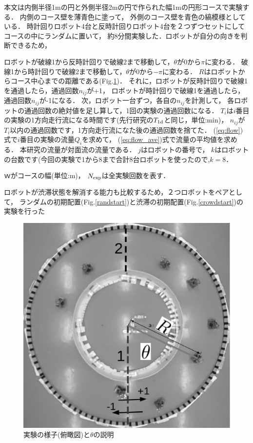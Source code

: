 本文は内側半径1mの円と外側半径2mの円で作られた幅1mの円形コースで実験する．
内側のコース壁を薄青色に塗って，
外側のコース壁を青色の縞模様としている．
時計回りロボット4台と反時計回りロボット4台を２つずつセットにしてコースの中にランダムに置いて，
約8分間実験した．ロボットが自分の向きを判断できるため，


ロボットが破線1から反時計回りで破線2まで移動して，$\theta$が0から$\pi$に変わる．
破線1から時計回りで破線2まで移動して，$\theta$が0から$-\pi$に変わる．
$R$はロボットからコース中心までの距離である(Fig.\ref{courseshitar})．
それに，ロボットが反時計回りで破線1を通過したら，通過回数$n_{ij}$が+1，
ロボットが時計回りで破線1を通過したら，通過回数$n_{ij}$が-1になる．
次，ロボット一台ずつ，各自の$n_{ij}$を計測して，
各ロボットの通過回数の絶対値を足し算して，1回の実験の通過回数になる．
$T_i$は$i$番目の実験の1方向走行流になる時間です(先行研究\cite{li}の$T_{\rm 1d}$と同じ，単位:min)，
$n_{ij}$が$T_i$以内の通過回数です，1方向走行流になた後の通過回数を捨てた．
(\ref{eq:flow})式で$i$番目の実験の流量$Q_i$を求めて，
(\ref{eq:flow_ave})式で流量の平均値を求める．
本研究の流量が対面流の流量である．
$j$はロボットの番号で，
$k$はロボットの台数です(今回の実験で1から8まで合計8台ロボットを使ったので,$k=8$．

$ｗ$がコースの幅(単位:m)，
$N_{\rm exp}$は全実験回数を表す．

ロボットが渋滞状態を解消する能力も比較するため，２つロボットをペアとして，
ランダムの初期配置(Fig.\ref{randstart})と渋滞の初期配置(Fig.\ref{crowdstart})の実験を行った

\vspace{-1mm}
\begin{figure}[h]
        \centering
        \includegraphics[width=0.6\linewidth]{shitaR.eps}
        \caption{実験の様子(俯瞰図)と$\theta$の説明}
        \label{courseshitar}
\end{figure}

